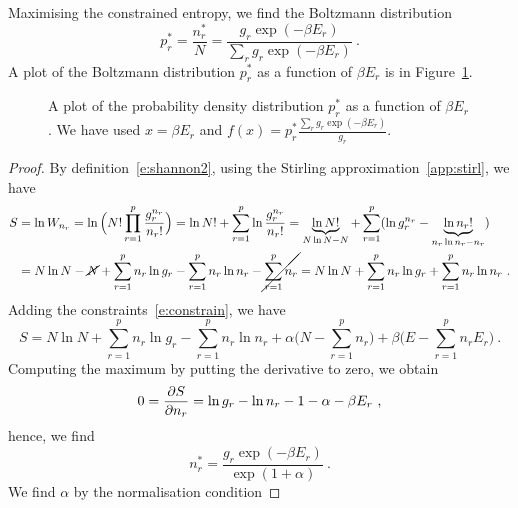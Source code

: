     Maximising the constrained entropy, we find the Boltzmann distribution 
    \begin{equation*}
        p_r^* = \frac{n_r^*}{N} = \frac{g_r \exp(- \beta E_r)}{\sum_r g_r \exp(- \beta E_r)} ~.
    \end{equation*}
    A plot of the Boltzmann distribution $p_r^*$ as a function of $\beta E_r$ is in Figure~\ref{en:bol}.
    \begin{figure}
        \centering
        \caption{A plot of the probability density distribution $p_r^*$ as a function of $\beta E_r$. We have used $x = \beta E_r$ and $f(x) = p_r^* \frac{\sum_r g_r \exp(- \beta E_r)}{g_r}$.}
        \label{en:bol}
    \end{figure}
    \begin{proof}
        By definition~\eqref{e:shannon2}, using the Stirling approximation~\eqref{app:stirl}, we have
        \begin{equation*}
        \begin{aligned}
            S & = \ln W_{n_r} = \ln \Big (N! \prod_{r=1}^p \frac{g_r^{n_r}}{n_r!} \Big) = \ln N! + \sum_{r=1}^p \ln \frac{g_r^{n_r}}{n_r!} = \underbrace{\ln N!}_{N \ln N - N} + \sum_{r=1}^p (\ln g_r^{n_r} - \underbrace{\ln n_r!}_{n_r \ln n_r - n_r} ) \\ & = N \ln N - \cancel{N} + \sum_{r=1}^p n_r \ln g_r - \sum_{r=1}^p n_r \ln n_r - \cancel{\sum_{r=1}^p n_r} = N \ln N + \sum_{r=1}^p n_r \ln g_r + \sum_{r=1}^p n_r \ln n_r ~.
        \end{aligned}
        \end{equation*}
        Adding the constraints~\eqref{e:constrain}, we have
        \begin{equation*}
            S =  N \ln N + \sum_{r=1}^p n_r \ln g_r - \sum_{r=1}^p n_r \ln n_r + \alpha \Big (N - \sum_{r=1}^p n_r \Big) + \beta \Big (E - \sum_{r=1}^p n_r E_r \Big ) ~.
        \end{equation*}
        Computing the maximum by putting the derivative to zero, we obtain
        \begin{equation*}
            0 = \frac{\partial S}{\partial n_r} = \ln g_r - \ln n_r - 1 - \alpha - \beta E_r ~,
        \end{equation*}
        hence, we find
        \begin{equation*}
            n_r^* = \frac{g_r \exp(- \beta E_r)}{\exp(1 + \alpha)} ~.
        \end{equation*}
        We find $\alpha$ by the normalisation condition 

\end{proof}
